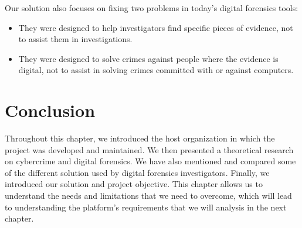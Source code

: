 Our solution also focuses on fixing two problems in today's digital forensics tools:
\begin{itemize}
    \item They were designed to help investigators find specific pieces of evidence, not to assist them in investigations.
    \item They were designed to solve crimes against people where the evidence is digital, not to assist in solving crimes committed with or against computers.
\end{itemize}
\section*{Conclusion}
Throughout this chapter, we introduced the host organization in which the project was developed and maintained. We then presented a theoretical research on cybercrime and digital forensics. We have also mentioned and compared some of the different solution used by digital forensics investigators. Finally, we introduced our solution and project objective. This chapter allows us to understand the needs and limitations that we need to overcome, which will lead to understanding the platform's requirements that we will analysis in the next chapter.
